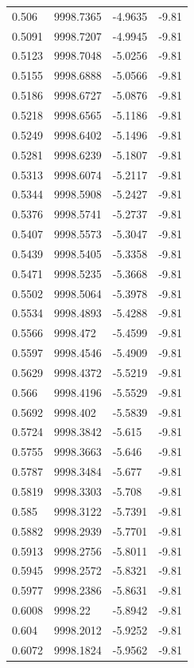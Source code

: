 \begin{table}[H]
\begin{tabular}{llll}
0.506 & 9998.7365 & -4.9635 & -9.81 \\
0.5091 & 9998.7207 & -4.9945 & -9.81 \\
0.5123 & 9998.7048 & -5.0256 & -9.81 \\
0.5155 & 9998.6888 & -5.0566 & -9.81 \\
0.5186 & 9998.6727 & -5.0876 & -9.81 \\
0.5218 & 9998.6565 & -5.1186 & -9.81 \\
0.5249 & 9998.6402 & -5.1496 & -9.81 \\
0.5281 & 9998.6239 & -5.1807 & -9.81 \\
0.5313 & 9998.6074 & -5.2117 & -9.81 \\
0.5344 & 9998.5908 & -5.2427 & -9.81 \\
0.5376 & 9998.5741 & -5.2737 & -9.81 \\
0.5407 & 9998.5573 & -5.3047 & -9.81 \\
0.5439 & 9998.5405 & -5.3358 & -9.81 \\
0.5471 & 9998.5235 & -5.3668 & -9.81 \\
0.5502 & 9998.5064 & -5.3978 & -9.81 \\
0.5534 & 9998.4893 & -5.4288 & -9.81 \\
0.5566 & 9998.472 & -5.4599 & -9.81 \\
0.5597 & 9998.4546 & -5.4909 & -9.81 \\
0.5629 & 9998.4372 & -5.5219 & -9.81 \\
0.566 & 9998.4196 & -5.5529 & -9.81 \\
0.5692 & 9998.402 & -5.5839 & -9.81 \\
0.5724 & 9998.3842 & -5.615 & -9.81 \\
0.5755 & 9998.3663 & -5.646 & -9.81 \\
0.5787 & 9998.3484 & -5.677 & -9.81 \\
0.5819 & 9998.3303 & -5.708 & -9.81 \\
0.585 & 9998.3122 & -5.7391 & -9.81 \\
0.5882 & 9998.2939 & -5.7701 & -9.81 \\
0.5913 & 9998.2756 & -5.8011 & -9.81 \\
0.5945 & 9998.2572 & -5.8321 & -9.81 \\
0.5977 & 9998.2386 & -5.8631 & -9.81 \\
0.6008 & 9998.22 & -5.8942 & -9.81 \\
0.604 & 9998.2012 & -5.9252 & -9.81 \\
0.6072 & 9998.1824 & -5.9562 & -9.81 \\

\end{tabular}
\end{table}

